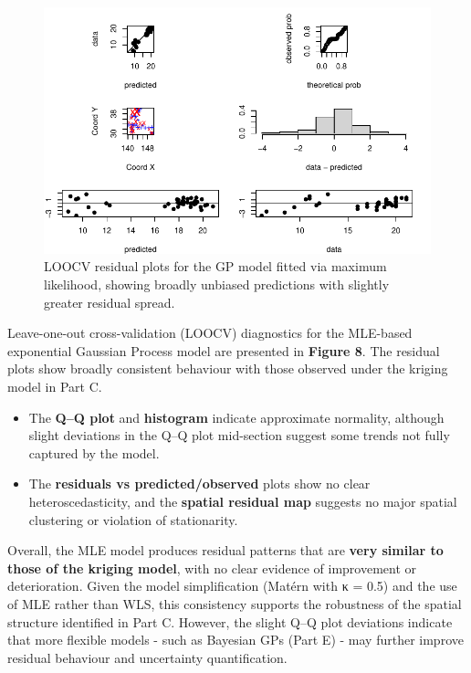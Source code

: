 \documentclass[
  11pt,
]{article}
\begin{document}
\begin{figure}[H]

{\centering \includegraphics{project_files/figure-pdf/fig-cvgp-1.pdf}

}

\caption{LOOCV residual plots for the GP model fitted via maximum
likelihood, showing broadly unbiased predictions with slightly greater
residual spread.}

\end{figure}%

Leave-one-out cross-validation (LOOCV) diagnostics for the MLE-based
exponential Gaussian Process model are presented in \textbf{Figure 8}.
The residual plots show broadly consistent behaviour with those observed
under the kriging model in Part C.

\begin{itemize}
\item
  The \textbf{Q--Q plot} and \textbf{histogram} indicate approximate
  normality, although slight deviations in the Q--Q plot mid-section
  suggest some trends not fully captured by the model.
\item
  The \textbf{residuals vs predicted/observed} plots show no clear
  heteroscedasticity, and the \textbf{spatial residual map} suggests no
  major spatial clustering or violation of stationarity.
\end{itemize}

Overall, the MLE model produces residual patterns that are \textbf{very
similar to those of the kriging model}, with no clear evidence of
improvement or deterioration. Given the model simplification (Matérn
with κ = 0.5) and the use of MLE rather than WLS, this consistency
supports the robustness of the spatial structure identified in Part C.
However, the slight Q--Q plot deviations indicate that more flexible
models - such as Bayesian GPs (Part E) - may further improve residual
behaviour and uncertainty quantification.
\end{document}
